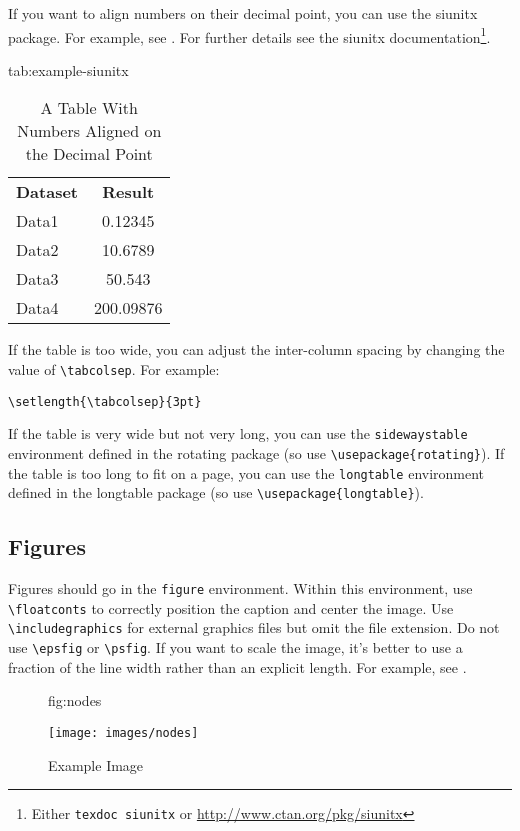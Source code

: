 \documentclass[pmlr,twocolumn,10pt]{jmlr} %
\begin{document}
If you want to align numbers on their decimal point, you can
use the \textsf{siunitx} package. For example, see
. For further details see the
\textsf{siunitx} documentation\footnote{Either \texttt{texdoc
siunitx} or \url{http://www.ctan.org/pkg/siunitx}}.

\begin{table}[htbp]
\floatconts
  {tab:example-siunitx}
  {\caption{A Table With Numbers Aligned on the Decimal Point}}
  {\begin{tabular}{lS[tabformat=3.5]}
  \bfseries Dataset & {\bfseries Result}\\
  Data1 & 0.12345\\
  Data2 & 10.6789\\
  Data3 & 50.543\\
  Data4 & 200.09876
  \end{tabular}}
\end{table}

If the table is too wide, you can adjust the inter-column
spacing by changing the value of \verb|\tabcolsep|. For
example:
\begin{verbatim}
\setlength{\tabcolsep}{3pt}
\end{verbatim}
If the table is very wide but not very long, you can use the
\texttt{sidewaystable} environment defined in the
\textsf{rotating} package (so use \verb|\usepackage{rotating}|).
If the table is too long to fit on a page, you can use the
\texttt{longtable} environment defined in the \textsf{longtable}
package (so use \verb|\usepackage{longtable}|).

\subsection{Figures}
\label{sec:figures}

Figures should go in the \texttt{figure} environment. Within this
environment, use \verb|\floatconts| to correctly position the
caption and center the image. Use \verb|\includegraphics|
for external graphics files but omit the file extension. Do not
use \verb|\epsfig| or \verb|\psfig|. If you want to scale the
image, it's better to use a fraction of the line width rather
than an explicit length. For example, see .

\begin{figure}[htbp]
\floatconts
  {fig:nodes}
  {\caption{Example Image}}
  {\texttt{[image: images/nodes]}}
\end{figure}
\end{document}

